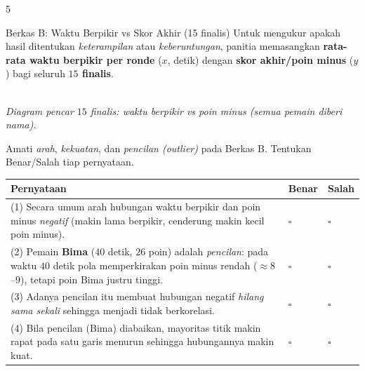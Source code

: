 \documentclass[11pt]{article}
\makeatletter
\newenvironment{bstabel}{%
  \par\smallskip\begin{center}\renewcommand{\arraystretch}{1.35}%
  \begin{tabular}{@{}p{0.72\textwidth}>{\centering\arraybackslash}m{1.5cm}>{\centering\arraybackslash}m{1.5cm}@{}}
  \toprule
  \textbf{Pernyataan} & \textbf{Benar} & \textbf{Salah}\\\midrule}%
  {\bottomrule\end{tabular}\end{center}}
\newcommand{\bs}[1]{#1 & $\square$ & $\square$\\[1pt]}
\makeatother
\begin{document}
\begin{soal}{5}
\begin{berkas}{Berkas B: Waktu Berpikir vs Skor Akhir (15 finalis)}
\centering\small
Untuk mengukur apakah hasil ditentukan \emph{keterampilan} atau
\emph{keberuntungan}, panitia memasangkan \textbf{rata-rata waktu berpikir per
ronde} ($x$, detik) dengan \textbf{skor akhir/poin minus} ($y$) bagi seluruh
\textbf{$15$ finalis}.
\begin{center}
\\[2pt]
{\small\textit{Diagram pencar $15$ finalis: waktu berpikir vs poin minus (semua pemain diberi nama).}}
\end{center}
\end{berkas}

\smallskip
Amati \emph{arah}, \emph{kekuatan}, dan \emph{pencilan (outlier)} pada Berkas B.
Tentukan Benar/Salah tiap pernyataan.
\begin{bstabel}
  \bs{(1) Secara umum arah hubungan waktu berpikir dan poin minus \emph{negatif} (makin lama berpikir, cenderung makin kecil poin minus).}
  \bs{(2) Pemain \textbf{Bima} ($40$ detik, $26$ poin) adalah \emph{pencilan}: pada waktu $40$ detik pola memperkirakan poin minus rendah ($\approx8$--$9$), tetapi poin Bima justru tinggi.}
  \bs{(3) Adanya pencilan itu membuat hubungan negatif \emph{hilang sama sekali} sehingga menjadi tidak berkorelasi.}
  \bs{(4) Bila pencilan (Bima) diabaikan, mayoritas titik makin rapat pada satu garis menurun sehingga hubungannya makin kuat.}
\end{bstabel}
\end{soal}
\end{document}
